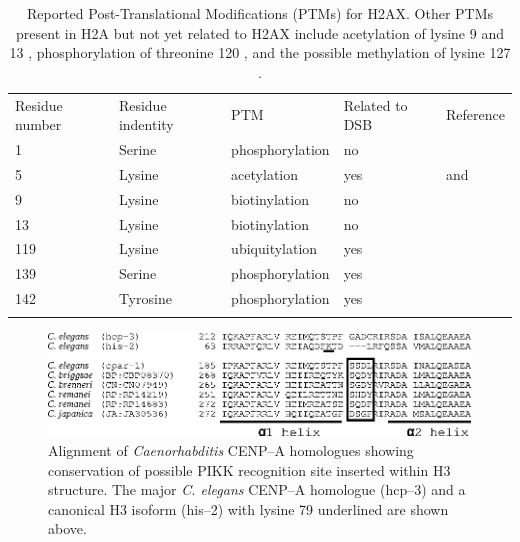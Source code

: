 \documentclass[graybox]{svmult}
\begin{document}
\begin{table}
\caption{Reported Post-Translational Modifications (PTMs) for H2AX\@. Other PTMs present in H2A but
not yet related to H2AX include acetylation of lysine 9 and 13 \protect\cite{ZEP+03}, phosphorylation
of threonine 120 \protect\cite{ANY+04}, and the possible methylation of lysine 127 \protect\cite{ZEP+03}.}
\label{tab:H2AX-PTM}
\begin{tabular}{p{1.0cm}p{1.2cm}p{2.1cm}p{1.0cm}p{5.80cm}}
\hline\noalign{\smallskip}
Residue \newline number & Residue \newline indentity & PTM & Related \newline to DSB  & Reference  \\
\noalign{\smallskip}\svhline\noalign{\smallskip}
\hfill 1   & Serine & phosphorylation & no  & \cite{PB81} \\
\hfill 5   & Lysine    & acetylation     & yes & \cite{PB81} and \cite{ITK+07} \\
\hfill 9   & Lysine    & biotinylation   & no  & \cite{CCK+06} \\
\hfill 13  & Lysine   & biotinylation   & no  & \cite{CCK+06} \\
\hfill 119 & Lysine  & ubiquitylation  & yes & \cite{ITK+07} \\
\hfill 139 & Serine  & phosphorylation & yes & \cite{EPR+98} \\
\hfill 142 & Tyrosine  & phosphorylation & yes & \cite{XLS+09} \\
\noalign{\smallskip}\hline\noalign{\smallskip}
\end{tabular}
\end{table}

\newpage

\begin{figure}
\includegraphics{Fig1}
\caption{Alignment of \protect\emph{Caenorhabditis} \protect\mbox{CENP--A} homologues showing
conservation of possible PIKK recognition site inserted within H3 structure. The major
\protect\emph{C\@. elegans} \protect\mbox{CENP--A} homologue (\protect\mbox{hcp--3}) and a canonical
H3 isoform (\protect\mbox{his--2}) with lysine 79 underlined are shown above.}
\label{fig:celegans}
\end{figure}
\end{document}
